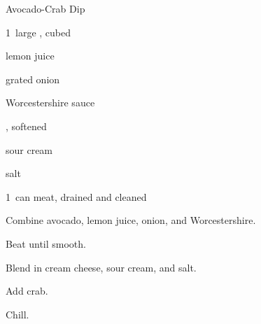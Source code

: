 \begin{recipe}{Avocado-Crab Dip}{}{}

\begin{ingredients}
\item 1~large , cubed
\item {} lemon juice
\item {} grated onion
\item {} Worcestershire sauce
\item {} , softened
\item \C{\quarter} sour cream
\item \tp{\quarter} salt
\item 1~can  meat, drained and cleaned
\end{ingredients}

\begin{directions}
\item Combine avocado, lemon juice, onion, and Worcestershire.
\item Beat until smooth.
\item Blend in cream cheese, sour cream, and salt.
\item Add crab.
\item Chill.
\end{directions}

\end{recipe}
